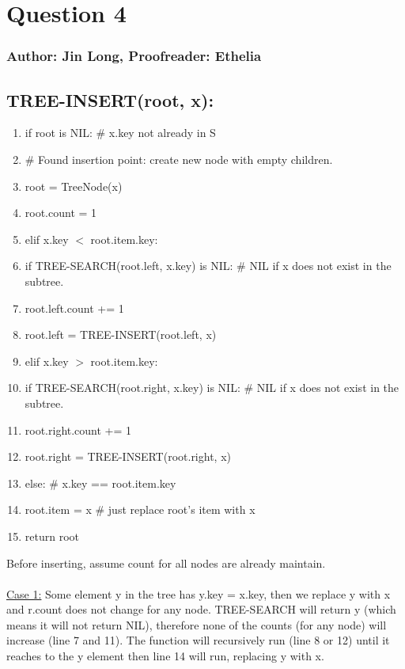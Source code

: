 \documentclass{article}
\begin{document}
\newpage
\section*{Question 4}
\subsubsection*{Author: Jin Long, Proofreader: Ethelia}
\subsection*{TREE-INSERT(root, x):}
\begin{enumerate}[itemsep=0pt,parsep=0pt]
    \item if root is NIL:  \quad\# x.key not already in S
    \item \qquad \# Found insertion point: create new node with empty children.
    \item \qquad root = TreeNode(x)
    \item \qquad root.count = 1
    \item elif x.key $<$ root.item.key:
    \item \qquad if TREE-SEARCH(root.left, x.key) is NIL: \quad\# NIL if x does not exist in the subtree.
    \item \qquad \qquad root.left.count += 1
    \item \qquad root.left = TREE-INSERT(root.left, x)
    \item elif x.key $>$ root.item.key:
    \item \qquad if TREE-SEARCH(root.right, x.key) is NIL: \quad\# NIL if x does not exist in the subtree.
    \item \qquad \qquad root.right.count += 1
    \item \qquad root.right = TREE-INSERT(root.right, x)
    \item else:  \quad\# x.key == root.item.key
    \item \qquad root.item = x  \quad\# just replace root's item with x
    \item return root
\end{enumerate}
Before inserting, assume count for all nodes are already maintain.\\~\\
\underline{Case 1:} Some element y in the tree has y.key = x.key, then we replace y with x and r.count does not change for any node. TREE-SEARCH will return y (which means it will not return NIL), therefore none of the counts (for any node) will increase (line 7 and 11). The function will recursively run (line 8 or 12) until it reaches to the y element then line 14 will run, replacing y with x.\\~\\
\end{document}
